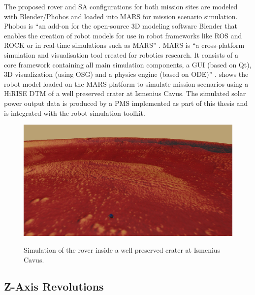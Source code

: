 The proposed rover and \ac{SA} configurations for both mission sites are modeled with Blender/Phobos and loaded into MARS for mission scenario simulation. Phobos is ``an add-on for the open-source 3D modeling software Blender that enables the creation of robot models for use in robot frameworks like ROS and ROCK or in real-time simulations such as MARS'' . MARS is ``a cross-platform simulation and visualisation tool created for robotics research. It consists of a core framework containing all main simulation components, a GUI (based on Qt), 3D visualization (using OSG) and a physics engine (based on ODE)'' .  shows the robot model loaded on the MARS platform to simulate mission scenarios using a \ac{HiRISE} \ac{DTM} of a well preserved crater at Ismenius Cavus. The simulated solar power output data is produced by a \ac{PMS} implemented as part of this thesis and is integrated with the robot simulation toolkit.

\vspace{0.2cm}

\begin{figure}[h]
  \captionsetup[subfigure]{justification=centering}
  \centering
  \hypersetup{linkcolor=captionTextColor}
  \includegraphics[width=0.9\linewidth]{sections/power-system-design/simulation/images/mars-sim-ismenius-cavus.png}\\
  \caption[Simulation of the rover inside a well preserved crater at Ismenius Cavus]
          {Simulation of the rover inside a well preserved crater at Ismenius Cavus.}
  \label{fig:simulated-mission-site-ismenius-cavus}
\end{figure}

\subsection{Z-Axis Revolutions}

